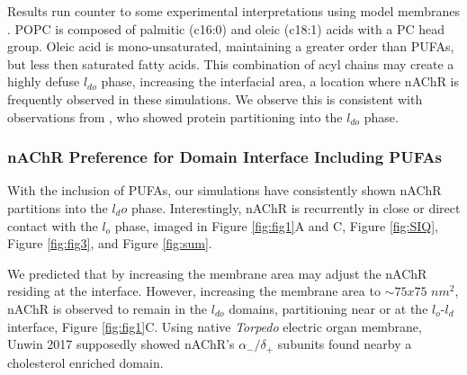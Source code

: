 	Results run counter to some experimental interpretations using model membranes \cite{Perillo_Transbilayer_2016,Pato_Role_2008}.
	POPC is composed of palmitic (c16:0) and oleic (c18:1) acids with a PC head group. Oleic acid is mono-unsaturated, maintaining a greater order than PUFAs, but less then saturated fatty acids. This combination of acyl chains may create a highly defuse $l_{do}$ phase, increasing the interfacial area, a location where nAChR is frequently observed in these simulations. We observe this is consistent with observations from \cite{Schafer2011}, who showed protein partitioning into the $l_{do}$ phase. %

	\subsubsection{nAChR Preference for Domain Interface Including PUFAs} \label{Interface}

	With the inclusion of PUFAs, our simulations have consistently shown nAChR partitions into the $l_do$ phase. Interestingly, nAChR is recurrently in close or direct contact with the $l_o$ phase, imaged in Figure \ref{fig:fig1}A and C, Figure \ref{fig:SIQ}, Figure \ref{fig:fig3}, and Figure \ref{fig:sum}.

	We predicted that by increasing the membrane area may adjust the nAChR residing at the interface. However, increasing the membrane area to $\sim 75x75$ $nm^2$, nAChR is observed to remain in the $l_{do}$ domains, partitioning near or at the $l_o$-$l_d$ interface, Figure \ref{fig:fig1}C. Using native \textit{Torpedo} electric organ membrane, Unwin 2017 \cite{Unwin_Segregation_2017} supposedly showed nAChR's $\alpha_{-}/\delta_{+}$ subunits found nearby a cholesterol enriched domain. 


